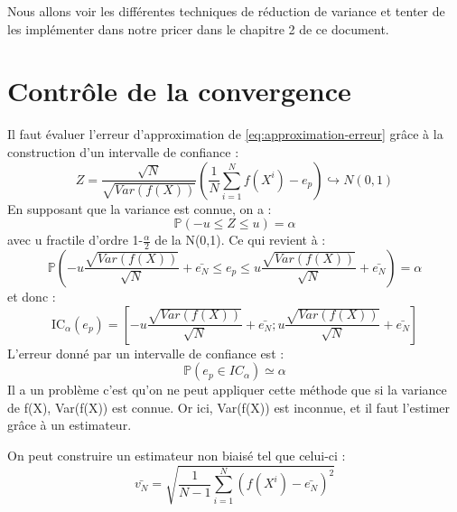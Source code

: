 \documentclass[12pt]{report}
\begin{document}
Nous allons voir les différentes techniques de réduction de variance et tenter de les implémenter dans notre pricer dans le chapitre 2 de ce document.

\section{Contrôle de la convergence}

Il faut évaluer l’erreur d’approximation de \eqref{eq:approximation-erreur}  grâce à la construction d’un intervalle de confiance :
\begin{equation}
	Z = \frac{\sqrt{N}}{\sqrt{Var(f(X))}} (\frac{1}{N}\sum_{i=1}^{N}f(X^i)-e_p)\hookrightarrow N(0,1)
\end{equation}
En supposant que la variance est connue, on a :
\begin{equation}
	\mathbb{P}(-u\leq Z \leq u) = \alpha
\end{equation}
avec u fractile d'ordre 1-$\frac{\alpha}{2}$ de la N(0,1). Ce qui revient à :
\begin{equation}
	\mathbb{P}(-u \frac{\sqrt{Var(f(X))}}{\sqrt{N}}+\bar{e_N}\leq e_p \leq u \frac{\sqrt{Var(f(X))}}{\sqrt{N}}+\bar{e_N}) = \alpha
\end{equation}
et donc :
\begin{equation}
	\text{IC}_\alpha(e_p) = [-u \frac{\sqrt{Var(f(X))}}{\sqrt{N}}+\bar{e_N};u \frac{\sqrt{Var(f(X))}}{\sqrt{N}}+\bar{e_N}]
\end{equation}
L’erreur donné par un intervalle de confiance est :
\begin{equation}
	\mathbb{P}(e_p\in IC_\alpha ) \simeq \alpha
\end{equation}
Il a un problème c’est qu’on ne peut appliquer cette méthode que si la variance de f(X), Var(f(X)) est connue. Or ici, Var(f(X)) est inconnue, et il faut l’estimer grâce à un estimateur.

On peut construire un estimateur non biaisé tel que celui-ci :
\begin{equation}
	\bar{v_N} = \sqrt{\frac{1}{N-1}\sum_{i=1}^{N}(f(X^i)-\bar{e_N})^2}
\end{equation}
\end{document}
